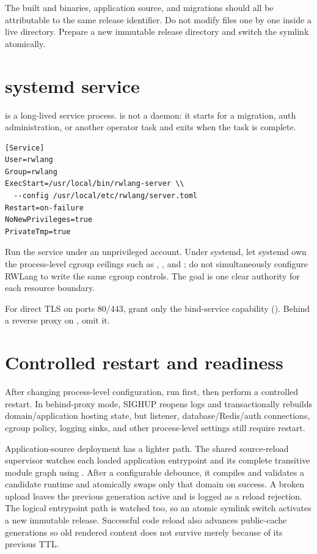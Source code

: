 The built  and  binaries, application source, and migrations should all be attributable to the same release identifier. Do not modify files one by one inside a live  directory. Prepare a new immutable release directory and switch the symlink atomically.

\section{systemd service}

 is a long-lived service process.  is not a daemon: it starts for a migration, auth administration, or another operator task and exits when the task is complete.

\begin{lstlisting}
[Service]
User=rwlang
Group=rwlang
ExecStart=/usr/local/bin/rwlang-server \\
  --config /usr/local/etc/rwlang/server.toml
Restart=on-failure
NoNewPrivileges=true
PrivateTmp=true
\end{lstlisting}

Run the service under an unprivileged account. Under systemd, let systemd own the process-level cgroup ceilings such as , , and ; do not simultaneously configure RWLang to write the same cgroup controls. The goal is one clear authority for each resource boundary.

For direct TLS on ports 80/443, grant only the bind-service capability (). Behind a reverse proxy on , omit it.

\section{Controlled restart and readiness}

After changing process-level configuration, run  first, then perform a controlled restart. In behind-proxy mode, SIGHUP reopens logs and transactionally rebuilds domain/application hosting state, but listener, database/Redis/auth connections, cgroup policy, logging sinks, and other process-level settings still require restart.

Application-source deployment has a lighter path. The shared source-reload supervisor watches each loaded application entrypoint and its complete transitive module graph using . After a configurable debounce, it compiles and validates a candidate runtime and atomically swaps only that domain on success. A broken upload leaves the previous generation active and is logged as a reload rejection. The logical entrypoint path is watched too, so an atomic  symlink switch activates a new immutable release. Successful code reload also advances public-cache generations so old rendered content does not survive merely because of its previous TTL.

